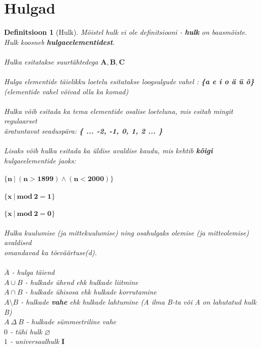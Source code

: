 \documentclass[12pt]{article}
\newtheorem{definition}[theorem]{Definitsioon}
\begin{document}
\section{Hulgad}
\begin{definition}[Hulk]
	Mõistel \textit{hulk} ei ole definitsiooni - \textbf{hulk} on baasmõiste. \\ 
	Hulk koosneb \textbf{hulgaeelementidest}. \\ 
	\\ 
	Hulka esitatakse suurtähtedega $\mathbf{A}, \mathbf{B}, \mathbf{C}$ 
	\\ 
	\\ 
	Hulga elementide täielikku loetelu esitatakse loogsulgude vahel : 
	\textbf{\{a e i o ä ü õ\}} \\ (elementide vahel võivad olla ka komad) 
	\\ 
	\\ 
	Hulka võib esitada ka tema elementide osalise loeteluna, mis esitab mingit regulaarset 
	\\ äratuntavat seaduspära:
	\textbf{\{ ... -2, -1, 0, 1, 2 ... \}}
	\\ 
	\\ 
	Lisaks võib hulka esitada ka üldise avaldise kaudu, mis kehtib \textbf{kõigi} hulgaeelementide jaoks: \\
\\ $\mathbf{\{n \ | \ (n > 1899) \wedge (n < 2000)\}}$ \\ 
  \\ 
	$\mathbf{\{ x \ | \ mod \ 2 = 1 \}}$
	\\ 
	\\ 
	$\mathbf{\{ x \ | \ mod \ 2 = 0 \}}$
  \\ 
	\\ 
	Hulka kuulumise (ja mittekuulumise) ning osahulgaks olemise (ja mitteolemise) avaldised \\ 
	omandavad ka tõeväärtuse(d).
	\\ 
	\\ 
	$\overline{A}$ - hulga täiend \\ 
	$A \cup B$ - hulkade ühend ehk hulkade liitmine  \\ 
	$A \cap B$ - hulkade ühisosa ehk hulkade korrutamine \\ 
	$A \setminus B$ - hulkade \textbf{vahe} ehk hulkade lahtumine (A ilma B-ta või A on lahutatud hulk B) \\
	$A \ \Delta \ B$ - hulkade sümmeetriline vahe \\ 
	$0$ - tühi hulk $\varnothing$ \\ 
	$1$ - universaalhulk $\mathbf{{I}}$
\end{definition}
\end{document}
